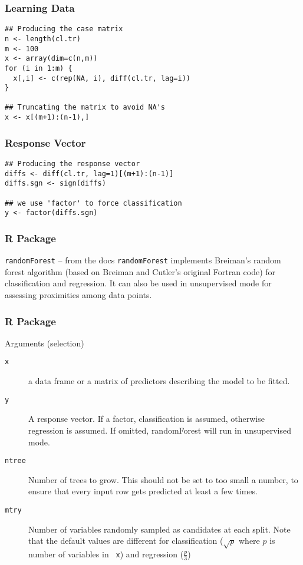 \documentclass[utf8]{beamer}
\theoremstyle{definition}
\theoremstyle{remark}
\begin{document}
\begin{frame}[fragile]
  \frametitle{Learning Data}
    \begin{lstlisting}
## Producing the case matrix
n <- length(cl.tr)
m <- 100
x <- array(dim=c(n,m))
for (i in 1:m) {
  x[,i] <- c(rep(NA, i), diff(cl.tr, lag=i))
}

## Truncating the matrix to avoid NA's
x <- x[(m+1):(n-1),]
    \end{lstlisting}
\end{frame}

\begin{frame}[fragile]
  \frametitle{Response Vector}
    \begin{lstlisting}
## Producing the response vector
diffs <- diff(cl.tr, lag=1)[(m+1):(n-1)]
diffs.sgn <- sign(diffs)

## we use 'factor' to force classification
y <- factor(diffs.sgn)
    \end{lstlisting}
\end{frame}

\begin{frame}[fragile]
  \frametitle{R Package}
  \begin{block}{{\tt randomForest} -- from the docs}
    {\tt randomForest} implements Breiman’s random forest algorithm (based on
    Breiman and Cutler’s original Fortran code) for classification and
    regression. It can also be used in unsupervised mode for assessing
    proximities among data points.
  \end{block}
\end{frame}

\begin{frame}[fragile]
  \frametitle{R Package}
  \begin{block}{Arguments (selection)}
    \begin{description}
      \item[{\tt x}] a data frame or a matrix of predictors describing the
        model to be fitted.
      \item[{\tt y}] A response vector. If a factor, classification is
        assumed, otherwise regression is assumed. If omitted, randomForest
        will run in unsupervised mode.
      \item[{\tt ntree}] Number of trees to grow. This should not be set to
        too small a number, to ensure that every input row gets predicted at
        least a few times.
      \item[{\tt mtry}] Number of variables randomly sampled as candidates at
        each split. Note that the default values are different for
        classification ($\sqrt{p}$ where $p$ is number of variables in {\tt
        x}) and regression ($\frac{p}{3}$)
    \end{description}
  \end{block}
\end{frame}
\end{document}
